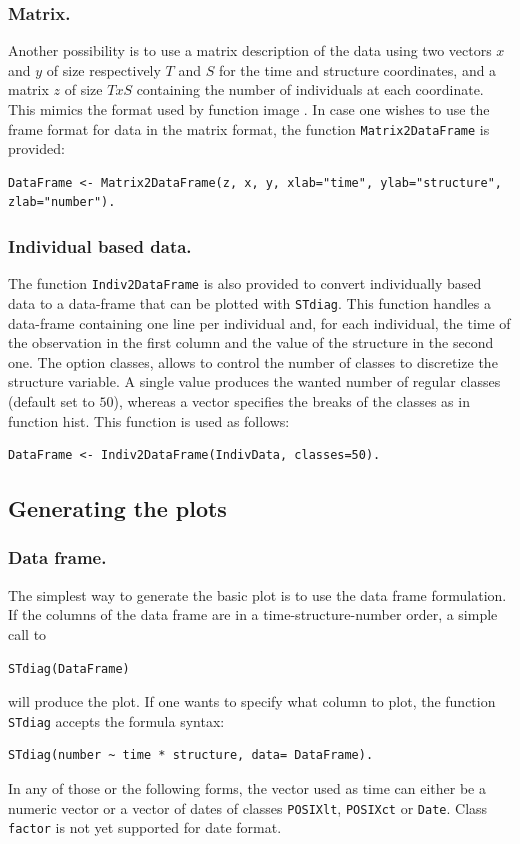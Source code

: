 \subsubsection{Matrix.}
Another possibility is to use a matrix description of the data using two vectors
$x$ and $y$ of size respectively $T$ and $S$ for the time and structure
coordinates, and a matrix $z$ of size $TxS$ containing the number of individuals
at each coordinate. This mimics the format used by function image \autocite{team2012a}.
In case one wishes to use the frame format for data in the matrix format, the
function \texttt{Matrix2DataFrame} is provided:
\begin{verbatim}
DataFrame <- Matrix2DataFrame(z, x, y, xlab="time", ylab="structure",
zlab="number").
\end{verbatim}

\subsubsection{Individual based data.}
The function \texttt{Indiv2DataFrame} is also provided to convert
individually based data to a data-frame that can be plotted with \texttt{STdiag}. This function handles a
data-frame containing one line per individual and, for each individual, the time
of the observation in the first column and the value of the structure in the
second one. The option classes, allows to control the number of classes to
discretize the structure variable. A single value produces the wanted number of
regular classes (default set to $50$), whereas a vector specifies the breaks of
the classes as in function hist. This function is used as follows:
\begin{verbatim}
DataFrame <- Indiv2DataFrame(IndivData, classes=50).
\end{verbatim}

\subsection{Generating the plots}

\subsubsection{Data frame.}
The simplest way to generate the basic plot is to use the data frame
formulation. If the columns of the data frame are in a time-structure-number
order, a simple call to
\begin{verbatim}
STdiag(DataFrame)
\end{verbatim}
will produce the plot. If one wants to specify what column to plot, the function
\texttt{STdiag} accepts the formula syntax:
\begin{verbatim}
STdiag(number ~ time * structure, data= DataFrame).
\end{verbatim}
In any of those or the following forms, the vector used as time can either be a
numeric vector or a vector of dates of classes \texttt{POSIXlt},
\texttt{POSIXct} or \texttt{Date}. Class \texttt{factor} is not yet supported
for date format.

